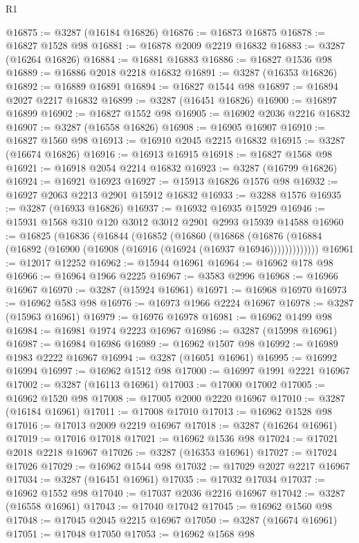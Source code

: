 \begin{lexlean}{R1}
\begin{coremodule}
@16875 := @3287 (@16184 @16826)
@16876 := @16873 @16875
@16878 := @16827 @1528 @98
@16881 := @16878 @2009 @2219 @16832
@16883 := @3287 (@16264 @16826)
@16884 := @16881 @16883
@16886 := @16827 @1536 @98
@16889 := @16886 @2018 @2218 @16832
@16891 := @3287 (@16353 @16826)
@16892 := @16889 @16891
@16894 := @16827 @1544 @98
@16897 := @16894 @2027 @2217 @16832
@16899 := @3287 (@16451 @16826)
@16900 := @16897 @16899
@16902 := @16827 @1552 @98
@16905 := @16902 @2036 @2216 @16832
@16907 := @3287 (@16558 @16826)
@16908 := @16905 @16907
@16910 := @16827 @1560 @98
@16913 := @16910 @2045 @2215 @16832
@16915 := @3287 (@16674 @16826)
@16916 := @16913 @16915
@16918 := @16827 @1568 @98
@16921 := @16918 @2054 @2214 @16832
@16923 := @3287 (@16799 @16826)
@16924 := @16921 @16923
@16927 := @15913 @16826 @1576 @98
@16932 := @16927 @2063 @2213 @2901 @15912 @16832
@16933 := @3288 @1576
@16935 := @3287 (@16933 @16826)
@16937 := @16932 @16935 @15929
@16946 := @15931 @1568 @310 @120 @3012 @3012 @2901 @2993 @15939 @14588
@16960 := @16825
    (@16836
      (@16844
        (@16852
          (@16860
            (@16868
              (@16876 (@16884 (@16892 (@16900 (@16908 (@16916 (@16924 (@16937 @16946)))))))))))))
@16961 := @12017 @12252
@16962 := @15944 @16961
@16964 := @16962 @178 @98
@16966 := @16964 @1966 @2225
@16967 := @3583 @2996
@16968 := @16966 @16967
@16970 := @3287 (@15924 @16961)
@16971 := @16968 @16970
@16973 := @16962 @583 @98
@16976 := @16973 @1966 @2224 @16967
@16978 := @3287 (@15963 @16961)
@16979 := @16976 @16978
@16981 := @16962 @1499 @98
@16984 := @16981 @1974 @2223 @16967
@16986 := @3287 (@15998 @16961)
@16987 := @16984 @16986
@16989 := @16962 @1507 @98
@16992 := @16989 @1983 @2222 @16967
@16994 := @3287 (@16051 @16961)
@16995 := @16992 @16994
@16997 := @16962 @1512 @98
@17000 := @16997 @1991 @2221 @16967
@17002 := @3287 (@16113 @16961)
@17003 := @17000 @17002
@17005 := @16962 @1520 @98
@17008 := @17005 @2000 @2220 @16967
@17010 := @3287 (@16184 @16961)
@17011 := @17008 @17010
@17013 := @16962 @1528 @98
@17016 := @17013 @2009 @2219 @16967
@17018 := @3287 (@16264 @16961)
@17019 := @17016 @17018
@17021 := @16962 @1536 @98
@17024 := @17021 @2018 @2218 @16967
@17026 := @3287 (@16353 @16961)
@17027 := @17024 @17026
@17029 := @16962 @1544 @98
@17032 := @17029 @2027 @2217 @16967
@17034 := @3287 (@16451 @16961)
@17035 := @17032 @17034
@17037 := @16962 @1552 @98
@17040 := @17037 @2036 @2216 @16967
@17042 := @3287 (@16558 @16961)
@17043 := @17040 @17042
@17045 := @16962 @1560 @98
@17048 := @17045 @2045 @2215 @16967
@17050 := @3287 (@16674 @16961)
@17051 := @17048 @17050
@17053 := @16962 @1568 @98

\end{coremodule}
\end{lexlean}
